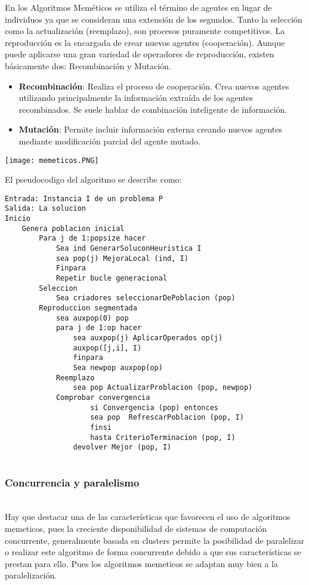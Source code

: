 \documentclass{article}
\begin{document}
En los Algoritmos Meméticos se utiliza el término de
agentes en lugar de individuos ya que se consideran una
extensión de los segundos.
Tanto la selección como la actualización (reemplazo), son
procesos puramente competitivos.
 La reproducción es la encargada de crear nuevos agentes
(cooperación). Aunque puede aplicarse una gran variedad
de operadores de reproducción, existen básicamente dos:
Recombinación y Mutación. \\
\begin{itemize}
   
\item \textbf{Recombinación}: Realiza el proceso de cooperación.
Crea nuevos agentes utilizando principalmente la
información extraída de los agentes recombinados.
Se suele hablar de combinación inteligente de información.\\

 \item \textbf{ Mutación}: Permite incluir información externa creando
nuevos agentes mediante modificación parcial del agente
mutado. 
\end{itemize}


\begin{center}
    \texttt{[image: memeticos.PNG]}
\end{center}
El pseudocodigo del algoritmo se describe como:

\begin{lstlisting}
Entrada: Instancia I de un problema P
Salida: La solucion
Inicio
    Genera poblacion inicial
        Para j de 1:popsize hacer
            Sea ind GenerarSoluconHeuristica I
            sea pop(j) MejoraLocal (ind, I)
            Finpara
            Repetir bucle generacional
        Seleccion
            Sea criadores seleccionarDePoblacion (pop)
        Reproduccion segmentada
            sea auxpop(0) pop
            para j de 1:op hacer
                sea auxpop(j) AplicarOperados op(j)
                auxpop([j,i], I)
                finpara
                Sea newpop auxpop(op)
            Reemplazo
                sea pop ActualizarProblacion (pop, newpop)
            Comprobar convergencia
                    si Convergencia (pop) entonces
                    sea pop  RefrescarPoblacion (pop, I)
                    finsi
                    hasta CriterioTerminacion (pop, I)
                devolver Mejor (pop, I)
                
\end{lstlisting}

\subsubsection{Concurrencia y paralelismo}\\
Hay que destacar una de las características que favorecen el uso de algoritmos memeticos, pues la creciente disponibilidad de sistemas de computación concurrente, generalmente basada en clusters permite la posibilidad de paralelizar o realizar este algoritmo de forma concurrente debido a que sus características se prestan para ello. Pues los algoritmos memeticos se adaptan muy bien a la paralelización.
\end{document}
